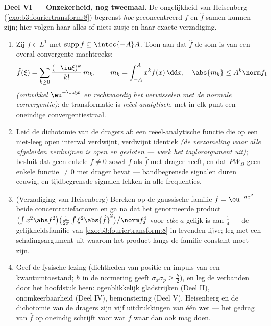 \begin{problem}[{Weekendopgave --- $\partial_tu =
\partial^2_{xx}u$, van begin tot eind opgelost}]
\medskip
\noindent\textbf{Deel VI --- Onzekerheid, nog tweemaal.} De
ongelijkheid van Heisenberg (\cref{exo:b3:fouriertransform:8})
begrenst \emph{hoe} geconcentreerd $f$ en $\hat f$ samen kunnen
zijn; hier volgen haar alles-of-niets-zusje en haar exacte
verzadiging.
\begin{enumerate}[resume]
  \item Zij $f \in L^1$ met $\operatorname{supp}f \subseteq
        \intcc{-A}A$. Toon aan dat $\hat f$ de som is van een
        overal convergente machtreeks:
        \[
        \hat f(\xi) = \sum_{k\geq0}\frac{(-\iu\xi)^k}{k!}
        \,m_k, \qquad m_k = \int_{-A}^{A}x^kf(x)\,\dd x,
        \quad \abs{m_k} \leq A^k\norm f_1
        \]
        \emph{(ontwikkel $\eu^{-\iu\xi x}$ en rechtvaardig het
        verwisselen met de normale convergentie)}: de
        transformatie is \emph{reëel-analytisch}, met in elk punt
        een oneindige convergentiestraal.
  \item Leid de dichotomie van de dragers af: een
        reëel-analytische functie die op een niet-leeg open
        interval verdwijnt, verdwijnt identiek \emph{(de
        verzameling waar alle afgeleiden verdwijnen is open en
        gesloten --- werk het taylorargument uit)}; besluit dat
        geen enkele $f \neq 0$ zowel $f$ als $\hat f$ met
         drager heeft, en dat $PW_\Omega$ geen enkele
        functie $\neq 0$ met  drager bevat ---
        bandbegrensde signalen duren eeuwig, en tijdbegrensde
        signalen lekken in alle frequenties.
  \item (Verzadiging van Heisenberg) Bereken op de gaussische
        familie $f = \eu^{-ax^2}$ beide concentratiefactoren en
        ga na dat het genormeerde product $\bigl(\int x^2\abs
        f^2\bigr)\bigl(\frac1{2\pi}\int \xi^2\abs{\hat
        f}^2\bigr)\big/\norm f_2^4$ voor \emph{elke} $a$ gelijk
        is aan $\frac14$ --- de gelijkheidsfamilie van
        \cref{exo:b3:fouriertransform:8} in levenden lijve; leg
        met een schalingsargument uit waarom het product langs de
        familie constant moet zijn.
  \item Geef de fysische lezing (dichtheden van positie en impuls
        van een kwantumtoestand; $\hbar$ in de normering geeft
        $\sigma_x\sigma_p \geq \frac\hbar2$), en leg de
        verbanden door het hoofdstuk heen: ogenblikkelijk
        gladstrijken (Deel II), onomkeerbaarheid (Deel IV),
        bemonstering (Deel V), Heisenberg en de dichotomie van de
        dragers zijn vijf uitdrukkingen van één wet --- het
        gedrag van $\hat f$ op oneindig schrijft voor wat $f$
        waar dan ook mag doen.
\end{enumerate}


\end{problem}
